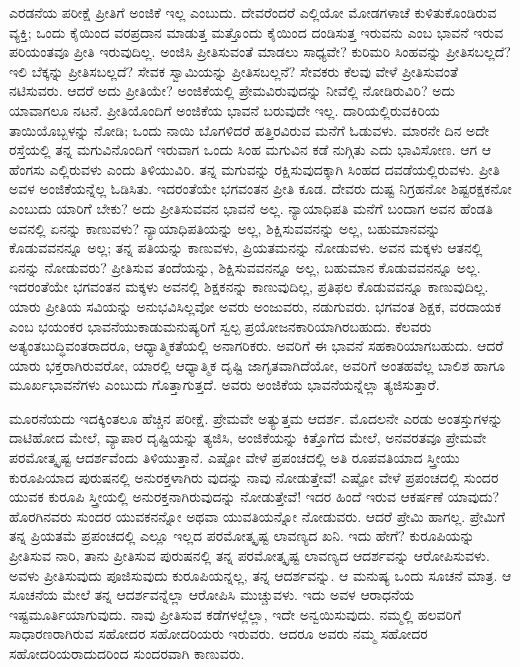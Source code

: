 ಎರಡನೆಯ ಪರೀಕ್ಷೆ ಪ್ರೀತಿಗೆ ಅಂಜಿಕೆ ಇಲ್ಲ ಎಂಬುದು. ದೇವರೆಂದರೆ ಎಲ್ಲಿಯೋ ಮೋಡಗಳಾಚೆ ಕುಳಿತುಕೊಂಡಿರುವ ವ್ಯಕ್ತಿ; ಒಂದು ಕೈಯಿಂದ ವರಪ್ರದಾನ ಮಾಡುತ್ತ ಮತ್ತೊಂದು ಕೈಯಿಂದ ದಂಡಿಸುತ್ತ ಇರುವನು ಎಂಬ ಭಾವನೆ ಇರುವ ಪರಿಯಂತವೂ ಪ್ರೀತಿ ಇರುವುದಿಲ್ಲ. ಅಂಜಿಸಿ ಪ್ರೀತಿಸುವಂತೆ ಮಾಡಲು ಸಾಧ್ಯವೇ? ಕುರಿಮರಿ ಸಿಂಹವನ್ನು ಪ್ರೀತಿಸಬಲ್ಲದೆ? ಇಲಿ ಬೆಕ್ಕನ್ನು ಪ್ರೀತಿಸಬಲ್ಲದೆ? ಸೇವಕ ಸ್ವಾಮಿಯನ್ನು ಪ್ರೀತಿಸಬಲ್ಲನೆ? ಸೇವಕರು ಕೆಲವು ವೇಳೆ ಪ್ರೀತಿಸುವಂತೆ ನಟಿಸುವರು. ಆದರೆ ಅದು ಪ್ರೀತಿಯೇ? ಅಂಜಿಕೆಯಲ್ಲಿ ಪ್ರೇಮವಿರುವುದನ್ನು ನೀವೆಲ್ಲಿ ನೋಡಿರುವಿರಿ? ಅದು ಯಾವಾಗಲೂ ನಟನೆ. ಪ್ರೀತಿಯೊಂದಿಗೆ ಅಂಜಿಕೆಯ ಭಾವನೆ ಬರುವುದೇ ಇಲ್ಲ. ದಾರಿಯಲ್ಲಿರುವಕಿರಿಯ ತಾಯಿಯೊಬ್ಬಳನ್ನು ನೋಡಿ; ಒಂದು ನಾಯಿ ಬೊಗಳಿದರೆ ಹತ್ತಿರವಿರುವ ಮನೆಗೆ ಓಡುವಳು. ಮಾರನೇ ದಿನ ಅದೇ ರಸ್ತೆಯಲ್ಲಿ ತನ್ನ ಮಗುವಿನೊಂದಿಗೆ ಇರುವಾಗ ಒಂದು ಸಿಂಹ ಮಗುವಿನ ಕಡೆ ನುಗ್ಗಿತು ಎದು ಭಾವಿಸೋಣ. ಆಗ ಆ ಹೆಂಗಸು ಎಲ್ಲಿರುವಳು ಎಂದು ತಿಳಿಯುವಿರಿ. ತನ್ನ ಮಗುವನ್ನು ರಕ್ಷಿಸುವುದಕ್ಕಾಗಿ ಸಿಂಹದ ದವಡೆಯಲ್ಲಿರುವಳು. ಪ್ರೀತಿ ಅವಳ ಅಂಜಿಕೆಯನ್ನೆಲ್ಲ ಓಡಿಸಿತು. ಇದರಂತೆಯೇ ಭಗವಂತನ ಪ್ರೀತಿ ಕೂಡ. ದೇವರು ದುಷ್ಟ ನಿಗ್ರಹನೋ ಶಿಷ್ಟರಕ್ಷಕನೋ ಎಂಬುದು ಯಾರಿಗೆ ಬೇಕು? ಅದು ಪ್ರೀತಿಸುವವನ ಭಾವನೆ ಅಲ್ಲ. ನ್ಯಾಯಾಧಿಪತಿ ಮನೆಗೆ ಬಂದಾಗ ಅವನ ಹೆಂಡತಿ ಅವನಲ್ಲಿ ಏನನ್ನು ಕಾಣುವಳು? ನ್ಯಾಯಾಧಿಪತಿಯನ್ನು ಅಲ್ಲ, ಶಿಕ್ಷಿಸುವವನನ್ನು ಅಲ್ಲ, ಬಹುಮಾನವನ್ನು ಕೊಡುವವನನ್ನೂ ಅಲ್ಲ; ತನ್ನ ಪತಿಯನ್ನು ಕಾಣುವಳು, ಪ್ರಿಯತಮನನ್ನು ನೋಡುವಳು. ಅವನ ಮಕ್ಕಳು ಆತನಲ್ಲಿ ಏನನ್ನು ನೋಡುವರು? ಪ್ರೀತಿಸುವ ತಂದೆಯನ್ನು, ಶಿಕ್ಷಿಸುವವನನ್ನೂ ಅಲ್ಲ, ಬಹುಮಾನ ಕೊಡುವವನನ್ನೂ ಅಲ್ಲ. ಇದರಂತೆಯೇ ಭಗವಂತನ ಮಕ್ಕಳು ಅವನಲ್ಲಿ ಶಿಕ್ಷಕನನ್ನು ಕಾಣುವುದಿಲ್ಲ, ಪ್ರತಿಫಲ ಕೊಡುವವನ್ನೂ ಕಾಣುವುದಿಲ್ಲ. ಯಾರು ಪ್ರೀತಿಯ ಸವಿಯನ್ನು ಅನುಭವಿಸಿಲ್ಲವೋ ಅವರು ಅಂಜುವರು, ನಡುಗುವರು. ಭಗವಂತ ಶಿಕ್ಷಕ, ವರದಾಯಕ ಎಂಬ ಭಯಂಕರ ಭಾವನೆಯುಕಾಡುಮನುಷ್ಯರಿಗೆ ಸ್ವಲ್ಪ ಪ್ರಯೋಜನಕಾರಿಯಾಗಿರಬಹುದು. ಕೆಲವರು ಅತ್ಯಂತಬುದ್ಧಿವಂತರಾದರೂ, ಆಧ್ಯಾತ್ಮಿಕತೆಯಲ್ಲಿ ಅನಾಗರಿಕರು. ಅವರಿಗೆ ಈ ಭಾವನೆ ಸಹಕಾರಿಯಾಗಬಹುದು. ಆದರೆ ಯಾರು ಭಕ್ತರಾಗಿರುವರೋ, ಯಾರಲ್ಲಿ ಆಧ್ಯಾತ್ಮಿಕ ದೃಷ್ಟಿ ಜಾಗೃತವಾಗಿದೆಯೋ, ಅವರಿಗೆ ಅಂತಹವೆಲ್ಲ ಬಾಲಿಶ ಹಾಗೂ ಮೂರ್ಖಭಾವನೆಗಳು ಎಂಬುದು ಗೊತ್ತಾಗುತ್ತದೆ. ಅವರು ಅಂಜಿಕೆಯ ಭಾವನೆಯನ್ನೆಲ್ಲಾ ತ್ಯಜಿಸುತ್ತಾರೆ.

ಮೂರನೆಯದು ಇದಕ್ಕಿಂತಲೂ ಹೆಚ್ಚಿನ ಪರೀಕ್ಷೆ. ಪ್ರೇಮವೇ ಅತ್ಯುತ್ತಮ ಆದರ್ಶ. ಮೊದಲನೇ ಎರಡು ಅಂತಸ್ತುಗಳನ್ನು ದಾಟಿಹೋದ ಮೇಲೆ, ವ್ಯಾಪಾರ ದೃಷ್ಟಿಯನ್ನು ತ್ಯಜಿಸಿ, ಅಂಜಿಕೆಯನ್ನು ಕಿತ್ತೊಗೆದ ಮೇಲೆ, ಅನವರತವೂ ಪ್ರೇಮವೇ ಪರಮೋತ್ಕೃಷ್ಟ ಆದರ್ಶವೆಂದು ತಿಳಿಯುತ್ತಾನೆ. ಎಷ್ಟೋ ವೇಳೆ ಪ್ರಪಂಚದಲ್ಲಿ ಅತಿ ರೂಪವತಿಯಾದ ಸ್ತ್ರೀಯು ಕುರೂಪಿಯಾದ ಪುರುಷನಲ್ಲಿ ಅನುರಕ್ತಳಾಗಿರು ವುದನ್ನು ನಾವು ನೋಡುತ್ತೇವೆ! ಎಷ್ಟೋ ವೇಳೆ ಪ್ರಪಂಚದಲ್ಲಿ ಸುಂದರ ಯುವಕ ಕುರೂಪಿ ಸ್ತ್ರೀಯಲ್ಲಿ ಅನುರಕ್ತನಾಗಿರುವುದನ್ನು ನೋಡುತ್ತೇವೆ! ಇದರ ಹಿಂದೆ ಇರುವ ಆಕರ್ಷಣೆ ಯಾವುದು? ಹೊರಗಿನವರು ಸುಂದರ ಯುವಕನನ್ನೋ ಅಥವಾ ಯುವತಿಯನ್ನೋ ನೋಡುವರು. ಆದರೆ ಪ್ರೇಮಿ ಹಾಗಲ್ಲ. ಪ್ರೇಮಿಗೆ ತನ್ನ ಪ್ರಿಯತಮೆ ಪ್ರಪಂಚದಲ್ಲಿ ಎಲ್ಲೂ ಇಲ್ಲದ ಪರಮೋತ್ಕೃಷ್ಟ ಲಾವಣ್ಯದ ಖನಿ. ಇದು ಹೇಗೆ? ಕುರೂಪಿಯನ್ನು ಪ್ರೀತಿಸುವ ನಾರಿ, ತಾನು ಪ್ರೀತಿಸುವ ಪುರುಷನಲ್ಲಿ ತನ್ನ ಪರಮೋತ್ಕೃಷ್ಟ ಲಾವಣ್ಯದ ಆದರ್ಶವನ್ನು ಆರೋಪಿಸುವಳು. ಅವಳು ಪ್ರೀತಿಸುವುದು ಪೂಜಿಸುವುದು ಕುರೂಪಿಯನ್ನಲ್ಲ, ತನ್ನ ಆದರ್ಶವನ್ನು. ಆ ಮನುಷ್ಯ ಒಂದು ಸೂಚನೆ ಮಾತ್ರ. ಆ ಸೂಚನೆಯ ಮೇಲೆ ತನ್ನ ಆದರ್ಶವನ್ನೆಲ್ಲಾ ಆರೋಪಿಸಿ ಮುಚ್ಚುವಳು. ಇದು ಅವಳ ಆರಾಧನೆಯ ಇಷ್ಟಮೂರ್ತಿಯಾಗುವುದು. ನಾವು ಪ್ರೀತಿಸುವ ಕಡೆಗಳಲ್ಲೆಲ್ಲಾ, ಇದೇ ಅನ್ವಯಿಸುವುದು. ನಮ್ಮಲ್ಲಿ ಹಲವರಿಗೆ ಸಾಧಾರಣರಾಗಿರುವ ಸಹೋದರ ಸಹೋದರಿಯರು ಇರುವರು. ಆದರೂ ಅವರು ನಮ್ಮ ಸಹೋದರ ಸಹೋದರಿಯ\-ರಾದುದರಿಂದ ಸುಂದರವಾಗಿ ಕಾಣುವರು.

